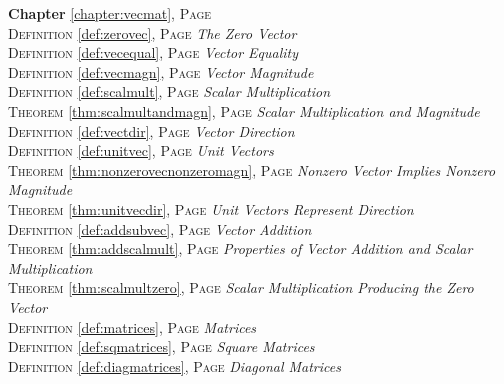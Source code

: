 
\begin{multicols}{2}
      \setlength{\parindent}{0pt}
      \footnotesize{

\textbf{Chapter} \ref{chapter:vecmat}, \textsc{Page} \pageref{chapter:vecmat} \\
\textsc{Definition} \ref{def:zerovec}, \textsc{Page} \pageref{def:zerovec} \textit{The Zero Vector} \\
\textsc{Definition} \ref{def:vecequal}, \textsc{Page} \pageref{def:vecequal} \textit{Vector Equality} \\
\textsc{Definition} \ref{def:vecmagn}, \textsc{Page} \pageref{def:vecmagn} \textit{Vector Magnitude} \\
\textsc{Definition} \ref{def:scalmult}, \textsc{Page} \pageref{def:scalmult} \textit{Scalar Multiplication} \\
\textsc{Theorem} \ref{thm:scalmultandmagn}, \textsc{Page} \pageref{thm:scalmultandmagn} \textit{Scalar Multiplication and Magnitude} \\
\textsc{Definition} \ref{def:vectdir}, \textsc{Page} \pageref{def:vectdir} \textit{Vector Direction} \\
\textsc{Definition} \ref{def:unitvec}, \textsc{Page} \pageref{def:unitvec} \textit{Unit Vectors} \\
\textsc{Theorem} \ref{thm:nonzerovecnonzeromagn}, \textsc{Page} \pageref{thm:nonzerovecnonzeromagn} \textit{Nonzero Vector Implies Nonzero Magnitude} \\
\textsc{Theorem} \ref{thm:unitvecdir}, \textsc{Page} \pageref{thm:unitvecdir} \textit{Unit Vectors Represent Direction} \\
\textsc{Definition} \ref{def:addsubvec}, \textsc{Page} \pageref{def:addsubvec} \textit{Vector Addition} \\
\textsc{Theorem} \ref{thm:addscalmult}, \textsc{Page} \pageref{thm:addscalmult} \textit{Properties of Vector Addition and Scalar Multiplication} \\
\textsc{Theorem} \ref{thm:scalmultzero}, \textsc{Page} \pageref{thm:scalmultzero} \textit{Scalar Multiplication Producing the Zero Vector} \\
\textsc{Definition} \ref{def:matrices}, \textsc{Page} \pageref{def:matrices} \textit{Matrices} \\
\textsc{Definition} \ref{def:sqmatrices}, \textsc{Page} \pageref{def:sqmatrices} \textit{Square Matrices} \\
\textsc{Definition} \ref{def:diagmatrices}, \textsc{Page} \pageref{def:diagmatrices} \textit{Diagonal Matrices} \\
}
\end{multicols}
